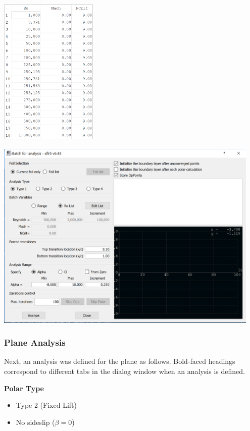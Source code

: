 \documentclass[]{auvsi_doc}
\begin{document}
\begin{center}
	\includegraphics[width=0.35\textwidth]{./figs/airfoilAnalysisTable.png}
	\label{relist}
\end{center}

\begin{center}
	\includegraphics[width=0.95\textwidth]{./figs/airfoilAnalysisSettings.png}
	\label{settings}
\end{center}

\subsubsection{Plane Analysis}
Next, an analysis was defined for the plane as follows. Bold-faced headings correspond to different tabs in the dialog window when an analysis is defined.

\textbf{Polar Type}
\begin{itemize}
	\item Type 2 (Fixed Lift)
	\item No sideslip ($\beta=0$)
\end{itemize}
\end{document}
